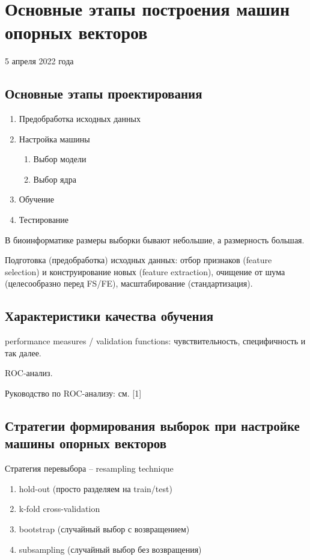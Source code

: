 \documentclass[main.tex]{subfiles}
\begin{document}
\section{Основные этапы построения машин опорных векторов}
5 апреля 2022 года

\subsection{Основные этапы проектирования}

\begin{enumerate}[noitemsep]
\item Предобработка исходных данных
\item Настройка машины
\begin{enumerate}[noitemsep]
	\item Выбор модели
	\item Выбор ядра
\end{enumerate}
\item Обучение
\item Тестирование

\end{enumerate}

В биоинформатике размеры выборки бывают небольшие, а размерность большая.

Подготовка (предобработка) исходных данных: отбор признаков (feature selection) и конструирование новых (feature extraction), очищение от шума (целесообразно перед FS/FE), масштабирование (стандартизация).

\subsection{Характеристики качества обучения}

performance measures / validation functions: чувствительность, специфичность и так далее.

ROC-анализ.
\begin{leftbar}
	Руководство по ROC-анализу: см. [1]
\end{leftbar}

\subsection{Стратегии формирования выборок при настройке машины опорных векторов}

Стратегия перевыбора -- resampling technique

\begin{enumerate}[noitemsep]
	\item hold-out (просто разделяем на train/test)
	\item k-fold cross-validation
	\item bootstrap (случайный выбор с возвращением)
	\item subsampling (случайный выбор без возвращения)
\end{enumerate}
\end{document}
